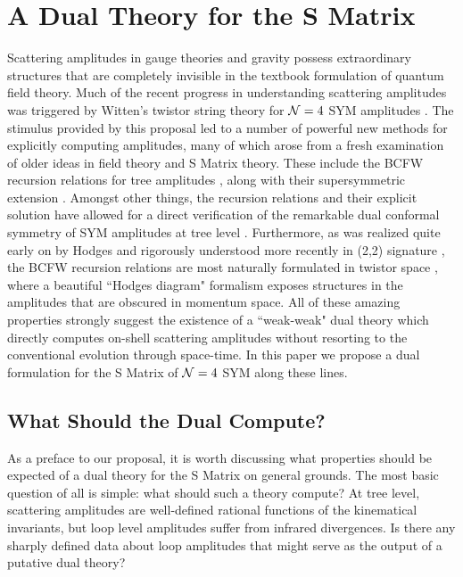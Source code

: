 \documentclass[12pt]{article}
\begin{document}
\section{A Dual Theory for the S Matrix}

Scattering amplitudes in gauge theories and gravity possess
extraordinary structures that are completely invisible in the
textbook formulation of quantum field theory.  Much of the recent
progress in understanding scattering amplitudes was triggered by
Witten's twistor string theory for ${\cal N} = 4$ SYM amplitudes
\cite{Witten:2003nn}. The stimulus provided by this proposal led to
a number of powerful new methods for explicitly computing
amplitudes, many of which arose from a fresh examination of older
ideas in field theory and S Matrix theory. These include the BCFW
recursion relations for tree amplitudes
\cite{bcf,bcfw,Bedford:2005yy,Cachazo:2005ca,Benincasa:2007qj,ArkaniHamed:2008yf,Cheung:2008dn},
along with their supersymmetric extension \cite{simplest, Brandhuber:2008pf}. Amongst
other things, the recursion relations and their explicit solution
\cite{Drummond:2008cr} have allowed for a direct verification of
the remarkable dual conformal symmetry \cite{Drummond:2006rz,Alday:2007hr} of SYM amplitudes at tree
level \cite{Drummond:2008bq}. Furthermore, as was realized quite early on by Hodges
\cite{Hodges:2005bf, Hodges:2005aj, Hodges:2006tw}
and rigorously understood more recently in (2,2) signature \cite{ArkaniHamed:2009si,lioneldavid}, the BCFW recursion relations
are most naturally formulated in twistor space \cite{Penrose:1967wn,
Penrose:1968me,Penrose:1972ia, Penrose:1999cw}, where a beautiful
``Hodges diagram" formalism exposes structures in the amplitudes that are obscured in momentum space.
All of these amazing properties strongly suggest the existence of a ``weak-weak" dual theory which directly computes on-shell scattering amplitudes without resorting to the conventional evolution through space-time. In this paper we propose a dual formulation for the S Matrix of ${\cal N} = 4$ SYM along these lines.

\subsection{What Should the Dual Compute?}

As a preface to our proposal, it is worth discussing what properties should be expected of a dual theory for the S Matrix on general grounds. The most basic question of all is simple: what should such a theory compute? At tree level, scattering amplitudes are well-defined rational functions of the kinematical invariants, but loop level amplitudes suffer from infrared divergences. Is there any sharply defined data about loop amplitudes that might serve as the output of a putative dual theory?
\end{document}
